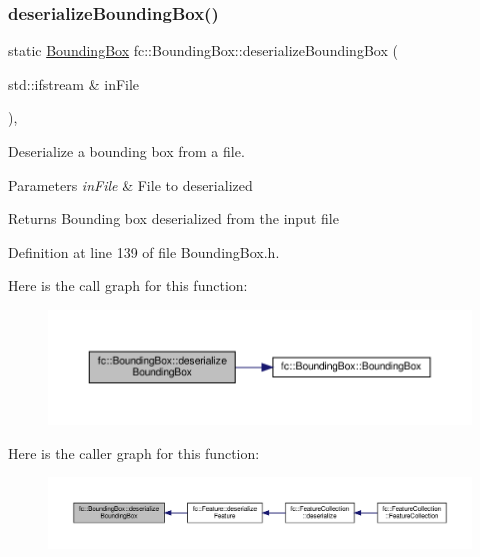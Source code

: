 \subsubsection{\texorpdfstring{deserialize\+Bounding\+Box()}{deserializeBoundingBox()}}
{\footnotesize\ttfamily static \hyperlink{classfc_1_1BoundingBox}{Bounding\+Box} fc\+::\+Bounding\+Box\+::deserialize\+Bounding\+Box (\begin{DoxyParamCaption}\item[{std\+::ifstream \&}]{in\+File }\end{DoxyParamCaption})\hspace{0.3cm}{\ttfamily [inline]}, {\ttfamily [static]}}



Deserialize a bounding box from a file. 


\begin{DoxyParams}{Parameters}
{\em in\+File} & File to deserialized \\
\hline
\end{DoxyParams}
\begin{DoxyReturn}{Returns}
Bounding box deserialized from the input file 
\end{DoxyReturn}


Definition at line 139 of file Bounding\+Box.\+h.

Here is the call graph for this function\+:
\nopagebreak
\begin{figure}[H]
\begin{center}
\leavevmode
\includegraphics[width=350pt]{db/dc1/classfc_1_1BoundingBox_acdd286d48651286d78c1b1eabe2357c9_cgraph}
\end{center}
\end{figure}
Here is the caller graph for this function\+:
\nopagebreak
\begin{figure}[H]
\begin{center}
\leavevmode
\includegraphics[width=350pt]{db/dc1/classfc_1_1BoundingBox_acdd286d48651286d78c1b1eabe2357c9_icgraph}
\end{center}
\end{figure}
\mbox{\label{classfc_1_1BoundingBox_aedfb5b832d699a78a954c6778208414c}} 
